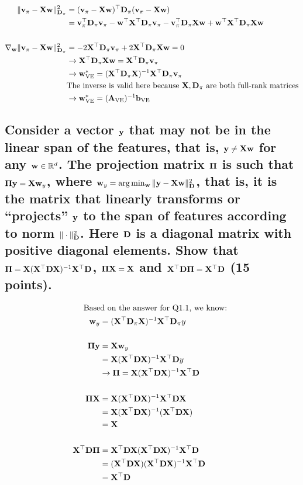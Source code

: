 \documentclass{article}
\newcommand{\X}{{\bf X}}
\newcommand{\bv}{{\bf v}}
\newcommand{\y}{{\bf y}}
\newcommand{\w}{{\bf w}}
\newcommand{\PI}{{\bf \Pi}}
\newcommand{\Real}{{\mathbb{R}}}
\newcommand{\D}{{\bf D}}
\newcommand{\A}{{\bf A}}
\newcommand{\bb}{{\bf b}}
\newcommand{\on}{\operatorname}
\begin{document}
\begin{align*}
	\Vert \bv_\pi - \X\w \Vert^2_{\D_\pi} &= (\bv_\pi - \X\w)^\top \D_\pi (\bv_\pi - \X\w) \\
	&= \bv_\pi^\top \D_\pi \bv_\pi - \w^\top\X^\top\D_\pi\bv_\pi - \bv_\pi^\top\D_\pi\X\w + \w^\top\X^\top\D_\pi\X\w \\
	\\
	\nabla_\w \Vert \bv_\pi - \X\w \Vert^2_{\D_\pi} &= -2\X^\top\D_\pi\bv_\pi + 2\X^\top\D_\pi\X\w = 0\\
	&\rightarrow \X^\top\D_\pi\X\w = \X^\top\D_\pi\bv_\pi \\
	&\rightarrow \w^*_{\on{VE}} = (\X^\top\D_\pi\X)^{-1}\X^\top\D_\pi\bv_\pi\\
	&\text{The inverse is valid here because $ \X, \D_\pi $ are both full-rank matrices}\\
	&\rightarrow \w^*_{\on{VE}} = (\A_{\on{VE}})^{-1} \bb_{\on{VE}}
\end{align*}


\newpage

\subsection{\normalsize 
Consider a vector $\y$ that may not be in the linear span of the features, that is, $\y\ne\X\w$ for any $\w\in\Real^d$. The projection matrix $\PI$ is such that $\PI \y = \X\w_y $, where $\w_y = \arg\min_{\w} \Vert \y - \X\w \Vert^2_\D$, that is, it is the matrix that linearly transforms or ``projects'' $\y$ to the span of features according to norm $\Vert \cdot \Vert^2_\D$. Here $\D$ is a diagonal matrix with positive diagonal elements. Show that $\PI = \X(\X^\top \D\X)^{-1}\X^\top\D$, $\PI\X=\X$ and $\X^\top\D\PI=\X^\top\D$
 (15 points).
}

\begin{align*}
	&\hspace{-20px}\text{Based on the answer for Q1.1, we know: } \\
	\w_y &= (\X^\top\D_\pi\X)^{-1}\X^\top\D_\pi y \\
	\\
	\PI \y &= \X\w_y\\
	&= \X(\X^\top\D\X)^{-1}\X^\top\D y \\
	&\rightarrow \PI = \X(\X^\top \D\X)^{-1}\X^\top\D\\
	\\
	\PI\X &= \X(\X^\top \D\X)^{-1}\X^\top\D \X\\
	&= \X(\X^\top \D\X)^{-1}(\X^\top\D \X) \\
	&= \X \\
	\\
	\X^\top\D\PI &= \X^\top\D \X(\X^\top \D\X)^{-1}\X^\top\D \\
	&= (\X^\top\D \X)(\X^\top \D\X)^{-1}\X^\top\D \\
	&= \X^\top\D
\end{align*}
\end{document}
